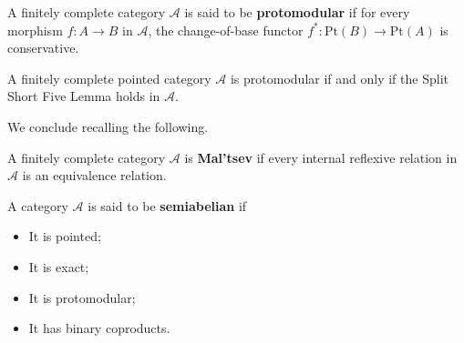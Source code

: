 \fontsize{12}{14.5}\selectfont
\begin{mainbox}{}
    \begin{defi}
        A finitely complete category $\mathcal{A}$ is said to be \textbf{protomodular} if for every morphism $f: A \to B$ in $\mathcal{A}$, the change-of-base functor $f^*: \mathrm{Pt}(B) \to \mathrm{Pt}(A)$ is conservative.
    \end{defi}
\end{mainbox}
A finitely complete pointed category $\mathcal{A}$ is protomodular if and only if the Split Short Five Lemma holds in $\mathcal{A}$.

We conclude recalling the following.

\begin{mainbox}{}
    \begin{defi}
        A finitely complete category $\mathcal{A}$ is \textbf{Mal'tsev} if every internal reflexive relation in $\mathcal{A}$ is an equivalence relation.
    \end{defi}
\end{mainbox}

\begin{mainbox}{}
    \begin{defi}
        A category $\mathcal{A}$ is said to be \textbf{semiabelian} if
        \begin{itemize}
            \item It is pointed;
            \item It is exact;
            \item It is protomodular;
            \item It has binary coproducts.
        \end{itemize}
    \end{defi}
\end{mainbox}


